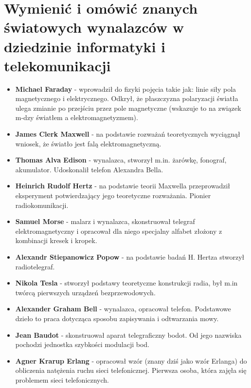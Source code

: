\documentclass[12pt,a4paper]{article}
\begin{document}
	\section{Wymienić i omówić znanych światowych wynalazców w dziedzinie informatyki i telekomunikacji}
	\begin{itemize}
		\item \textbf{Michael Faraday} - wprowadził do fizyki pojęcia takie jak: linie siły pola magnetycznego i elektrycznego. Odkrył, że płaszczyzna polaryzacji światła ulega zmianie po przejściu przez pole magnetyczne (wskazuje to na związek m-dzy światłem a elektromagnetyzmem).
	
		\item \textbf{James Clerk Maxwell} - na podstawie rozważań teoretycznych wyciągnął wniosek, że światło jest falą elektromagnetyczną.
		
		\item \textbf{Thomas Alva Edison} - wynalazca, stworzył m.in. żarówkę, fonograf, akumulator. Udoskonalił telefon Alexandra Bella.
		
		\item \textbf{Heinrich Rudolf Hertz} - na podstawie teorii Maxwella przeprowadził eksperyment potwierdzający jego teoretyczne rozważania. Pionier radiokomunikacji.
		
		\item \textbf{Samuel Morse} - malarz i wynalazca, skonstruował telegraf elektromagnetyczny i opracował dla niego specjalny alfabet złożony z kombinacji kresek i kropek.
		
		\item \textbf{Alexandr Stiepanowicz Popow} - na podstawie badań H. Hertza stworzył radiotelegraf.
		
		\item \textbf{Nikola Tesla} - stworzył podstawy teoretyczne konstrukcji radia, był m.in twórcą pierwszych urządzeń bezprzewodowych.
		
		\item \textbf{Alexander Graham Bell} - wynalazca, opracował telefon. Podstawowe dzieło to praca dotycząca sposobu zapisywania i odtwarzania mowy.
		
		\item \textbf{Jean Baudot} - skonstruował aparat telegraficzny bodot. Od jego nazwiska pochodzi jednostka szybkości modulacji bod.
		
		\item \textbf{Agner Krarup Erlang} - opracował wzór (znany dziś jako wzór Erlanga) do obliczenia natężenia ruchu sieci telefonicznej. Pierwsza osoba, która zajęła się problemem sieci telefonicznych.
	\end{itemize}
\end{document}
